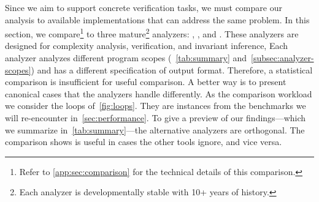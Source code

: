 Since we aim to support concrete verification tasks, we must compare our analysis to available implementations that can address the same problem.
In this section, we compare\footnote{Refer to \autoref{app:sec:comparison} for the technical details of this comparison.}
\impl to three mature\footnote{Each analyzer is developmentally stable with 10+ years of history.} analyzers: , , and .
These analyzers are designed for complexity analysis, verification, and invariant inference, \resp
Each analyzer analyzes different program scopes (\cf~\autoref{tab:summary} and~\autoref{subsec:analyzer-scopes}) and has a different specification of output format.
Therefore, a statistical comparison is insufficient for useful comparison.
A better way is to present canonical cases that the analyzers handle differently.
As the comparison workload we consider the loops of~\autoref{fig:loops}.
They are instances from the benchmarks we will re-encounter in~\autoref{sec:performance}.
To give a preview of our findings---which we summarize in~\autoref{tab:summary}---the alternative analyzers are {orthogonal}.
The comparison shows \impl is useful in cases the other tools ignore, and vice versa.

